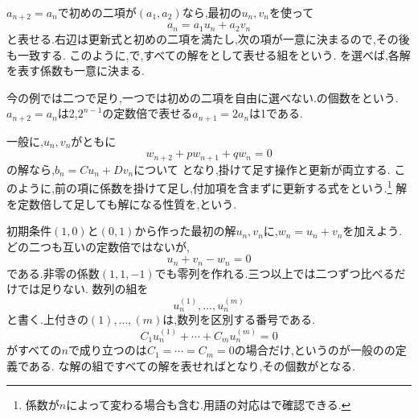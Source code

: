 $a_{n+2}=a_n$で初めの二項が$(a_1,a_2)$なら,最初の$u_n,v_n$を使って
\[
  a_n=a_1u_n+a_2v_n
\]
と表せる.右辺は更新式と初めの二項を満たし,次の項が一意に決まるので,その後も一致する.
このように,で,すべての解をとして表せる組を\textbf{}という.
を選べば,各解を表す係数も一意に決まる.

今の例では二つで足り,一つでは初めの二項を自由に選べない.の個数を\textbf{}という.
$a_{n+2}=a_n$は2,$2^{n-1}$の定数倍で表せる$a_{n+1}=2a_n$は1である.

一般に,$u_n,v_n$がともに
\[
  w_{n+2}+pw_{n+1}+qw_n=0
\]
の解なら,$b_n=Cu_n+Dv_n$について
\BookMathLayout{\[
    \begin{aligned}
      b_{n+2}+pb_{n+1}+qb_n
      &=C(u_{n+2}+pu_{n+1}+qu_n)\\
      &\quad+D(v_{n+2}+pv_{n+1}+qv_n)\\
      &=0
    \end{aligned}
  \]}{\[
    \begin{aligned}
      b_{n+2}+pb_{n+1}+qb_n\\
      {}=C(u_{n+2}+pu_{n+1}+qu_n)\\
      \quad+D(v_{n+2}+pv_{n+1}+qv_n)\\
      {}=0
    \end{aligned}
  \]}
となり,掛けて足す操作と更新が両立する.
このように,前の項に係数を掛けて足し,付加項を含まずに更新する式をという.\footnote{係数が$n$によって変わる場合も含む.用語の対応はで確認できる.}
解を定数倍して足しても解になる性質を,\textbf{}という.

初期条件$(1,0)$と$(0,1)$から作った最初の解$u_n,v_n$に,$w_n=u_n+v_n$を加えよう.
どの二つも互いの定数倍ではないが,
\[
  u_n+v_n-w_n=0
\]
である.非零の係数$(1,1,-1)$でも零列を作れる.三つ以上では二つずつ比べるだけでは足りない.
数列の組を
\[
  u^{(1)}_n,\ldots,u^{(m)}_n
\]
と書く.上付きの$(1),\ldots,(m)$は,数列を区別する番号である.
\[
  C_1u^{(1)}_n+\cdots+C_mu^{(m)}_n=0
\]
がすべての$n$で成り立つのは$C_1=\cdots=C_m=0$の場合だけ,というのが一般のの定義である.
\mbox{}な解の組ですべての解を表せればとなり,その個数がとなる.


